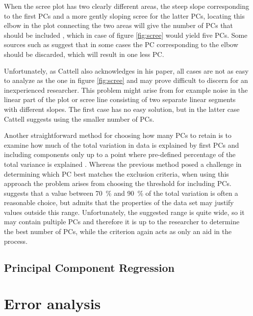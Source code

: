 \documentclass[english, oneside]{HYgradu}
\begin{document}
When the scree plot has two clearly different areas, the steep slope corresponding to the first PCs and a more gently sloping scree for the latter PCs, locating this elbow in the plot connecting the two areas will give the number of PCs that should be included \citep{jolliffe2002principal}, which in case of figure \ref{fig:scree} would yield five PCs. Some sources such as \citep{cattell1966scree} suggest that in some cases the PC corresponding to the elbow should be discarded, which will result in one less PC.

Unfortunately, as Cattell also acknowledges in his paper, all cases are not as easy to analyze as the one in figure \ref{fig:scree} and may prove difficult to discern for an inexperienced researcher. This problem might arise from for example noise in the linear part of the plot or scree line consisting of two separate linear segments with different slopes. The first case has no easy solution, but in the latter case Cattell suggests using the smaller number of PCs.

\reversemarginpar
{}
Another straightforward method for choosing how many PCs to retain is to examine how much of the total variation in data is explained by first PCs and including components only up to a point where pre-defined percentage of the total variance is explained \citep{jolliffe2002principal}. Whereas the previous method posed a challenge in determining which PC best matches the exclusion criteria, when using this approach the problem arises from choosing the threshold for including PCs. \citet{jolliffe2002principal} suggests that a value between 70~\% and 90~\% of the total variation is often a reasonable choice, but admits that the properties of the data set may justify values outside this range. Unfortunately, the suggested range is quite wide, so it may contain pultiple PCs and therefore it is up to the researcher to determine the best number of PCs, while the criterion again acts as only an aid in the process. 



\subsection{Principal Component Regression}

\section{Error analysis}
\end{document}

